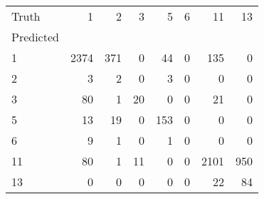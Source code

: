 \begin{tabular}{lrrrrrrr}
\toprule
Truth & 1 & 2 & 3 & 5 & 6 & 11 & 13 \\
Predicted &  &  &  &  &  &  &  \\
\midrule
1 & 2374 & 371 & 0 & 44 & 0 & 135 & 0 \\
2 & 3 & 2 & 0 & 3 & 0 & 0 & 0 \\
3 & 80 & 1 & 20 & 0 & 0 & 21 & 0 \\
5 & 13 & 19 & 0 & 153 & 0 & 0 & 0 \\
6 & 9 & 1 & 0 & 1 & 0 & 0 & 0 \\
11 & 80 & 1 & 11 & 0 & 0 & 2101 & 950 \\
13 & 0 & 0 & 0 & 0 & 0 & 22 & 84 \\
\bottomrule
\end{tabular}
